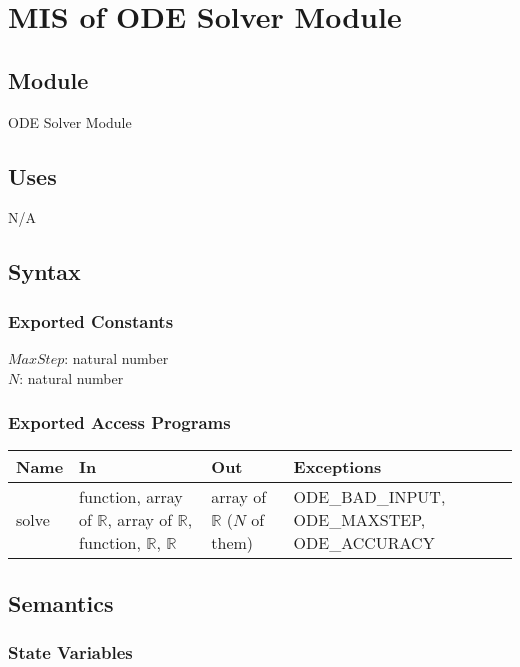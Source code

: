 \documentclass[12pt]{article}
\begin{document}
\newpage
\section{MIS of ODE Solver Module} \label{ODE}

\subsection{Module}

ODE Solver Module

\subsection{Uses}

N/A

\subsection{Syntax}

\subsubsection{Exported Constants}

$MaxStep$: natural number \\
$N$: natural number

\subsubsection{Exported Access Programs}

\begin{center}
\begin{tabular}{p{2cm} p{4cm} p{4cm} p{4cm}}
\hline
\textbf{Name} & \textbf{In} & \textbf{Out} & \textbf{Exceptions} \\
\hline
solve & function, array of $\mathbb{R}$, array of $\mathbb{R}$, function, $\mathbb{R}$, $\mathbb{R}$ & array of $\mathbb{R}$ ($N$ of them) & ODE\_BAD\_INPUT, ODE\_MAXSTEP, ODE\_ACCURACY \\
\hline 
\end{tabular}
\end{center}

\subsection{Semantics}

\subsubsection{State Variables}
\end{document}
